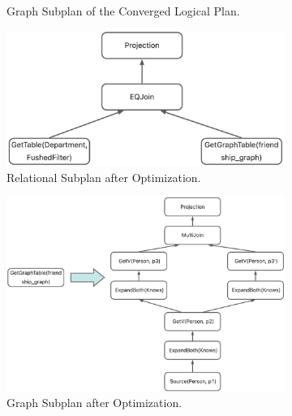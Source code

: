 \begin{figure}
\begin{subfigure}[b]{0.4\linewidth}
        \caption{Graph Subplan of the Converged Logical Plan.}
        \label{fig:converged-logical-plan-graph}
    \end{subfigure}
    \begin{subfigure}[b]{0.4\linewidth}
        \centering
        \includegraphics[width=\linewidth]{./figures/converged-logical-plan-relational-optimized.png}
        \caption{Relational Subplan after Optimization.}
        \label{fig:relational-plan-optimized}
    \end{subfigure}
    \begin{subfigure}[b]{0.4\linewidth}
        \centering
        \includegraphics[width=\linewidth]{./figures/converged-logical-plan-graph-optimized.png}
        \caption{Graph Subplan after Optimization.}
        \label{fig:graph-plan-optimized}
    \end{subfigure}
    \begin{subfigure}[b]{0.4\linewidth}
        \centering

\end{subfigure}
\end{figure}
